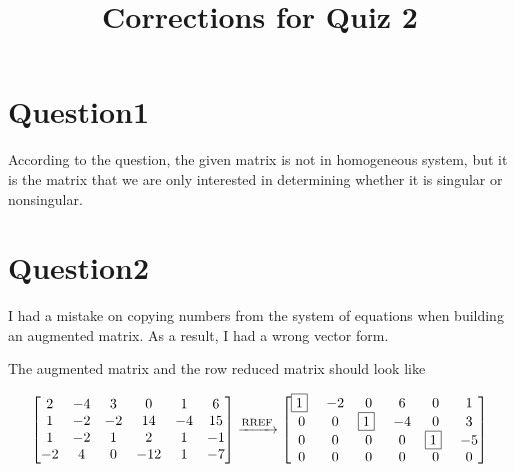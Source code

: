 \documentclass{article}
\title{Corrections for Quiz 2}
\begin{document}
\maketitle

\newcommand{\sol} {
  \textbf{Solution:}
}

\newcommand{\LIVHS} {\textbf{Linearly Independent Vectors and Homogeneous Systems}}

\newcommand{\FVCS} {\textbf{Free Variables for Consistent Systems}}

\newcommand{\HSC} {\textbf{Homogeneous Systems are Consistent}}

\newcommand{\ls} {\(\mathcal{LS}(A,\textbf{0})\)}

\newcommand{\nullspace} {\(\mathcal{N}(A)\)}

\newcommand{\p} {$\boxed{1}$~}

\section{Question1}

According to the question, the given matrix is not in homogeneous system, but it is the matrix that we are only interested in determining whether it is singular or nonsingular.


\section{Question2}
I had a mistake on copying numbers from the system of equations when building an augmented matrix.
As a result, I had a wrong vector form.

The augmented matrix and the row reduced matrix should look like

\begin{equation}
  \begin{bmatrix}
    2 & -4 & 3 & 0 & 1 & 6 \\
    1 & -2 & -2 & 14 & -4 & 15 \\
    1 & -2 & 1 & 2 & 1 & -1 \\
    -2 & 4 & 0 & -12 & 1 & -7
  \end{bmatrix}
\xrightarrow[]{\text{RREF}}
\begin{bmatrix}
  \p & -2 & 0 & 6 & 0 & 1 \\
  0 & 0 & \p & -4 & 0 & 3 \\
  0 & 0 & 0 & 0 & \p & -5 \\
  0 & 0 & 0 & 0 & 0 & 0 \\
\end{bmatrix}
\end{equation}
\end{document}
